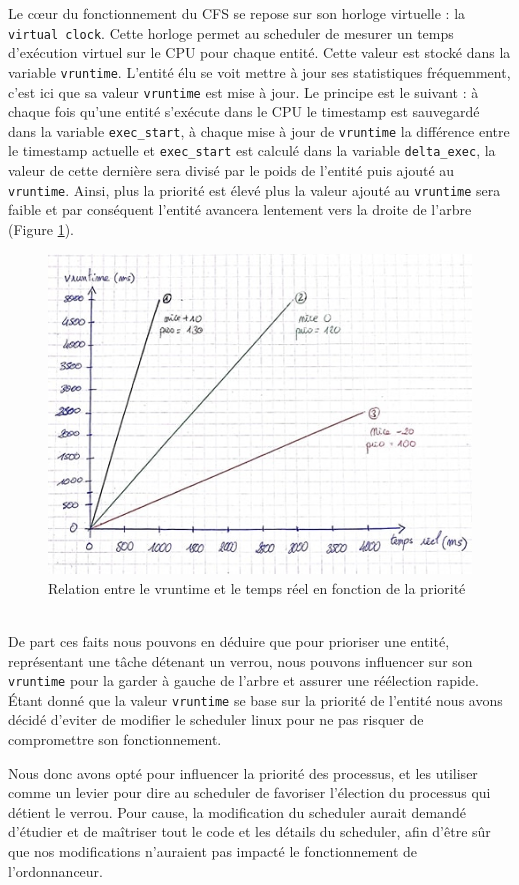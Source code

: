 Le cœur du fonctionnement du CFS se repose sur son horloge virtuelle : la
\verb|virtual clock|. Cette horloge permet au scheduler de mesurer un temps
d'exécution virtuel sur le CPU pour chaque entité. Cette valeur est stocké dans
la variable \verb|vruntime|. L'entité élu se voit mettre à jour ses statistiques
fréquemment, c'est ici que sa valeur \verb|vruntime| est mise à jour. Le
principe est le suivant : à chaque fois qu'une entité s'exécute dans le CPU le
timestamp est sauvegardé dans la variable \verb|exec_start|, à chaque mise à
jour de \verb|vruntime| la différence entre le timestamp actuelle et
\verb|exec_start| est calculé dans la variable \verb|delta_exec|, la valeur de
cette dernière sera divisé par le poids de l'entité puis ajouté au
\verb|vruntime|. Ainsi, plus la priorité est élevé plus la valeur ajouté au
\verb|vruntime| sera faible et par conséquent l'entité avancera lentement vers
la droite de l'arbre (Figure \ref{fig:sched}).
\begin{figure}[h!]
	\centering
	\includegraphics[scale=0.6]{include/schema_sched.jpg}
	\caption{Relation entre le vruntime et le temps réel en fonction de la priorité}
	\label{fig:sched}
\end{figure}
\\

De part ces faits nous pouvons en déduire que pour prioriser une entité, 
représentant une tâche détenant un verrou, nous pouvons influencer sur son 
\verb|vruntime| pour la garder à gauche de l'arbre et assurer une réélection 
rapide. Étant donné que la valeur \verb|vruntime| se base sur la priorité de 
l'entité nous avons décidé d'eviter de modifier le scheduler linux pour
ne pas risquer de compromettre son fonctionnement. 

Nous donc avons opté pour influencer la priorité des processus, et 
les utiliser comme un levier pour dire au scheduler de favoriser l'élection 
du processus qui détient le verrou. Pour cause, la modification du scheduler aurait
demandé d'étudier et de maîtriser tout le code et les détails du scheduler, afin
d'être sûr que nos modifications n'auraient pas impacté le fonctionnement de
l'ordonnanceur.